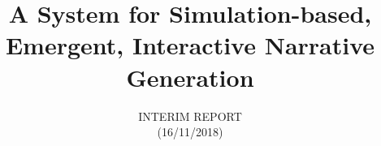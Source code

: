 \documentclass{sig-alternate-05-2015}
\begin{document}



\conferenceinfo{}{}

\acmPrice{}

%


\title{A System for Simulation-based, Emergent, Interactive Narrative Generation}
\subtitle{\large\textrm{INTERIM REPORT\\ (16/11/2018)}}
%
%
%
%
%
\end{document}
